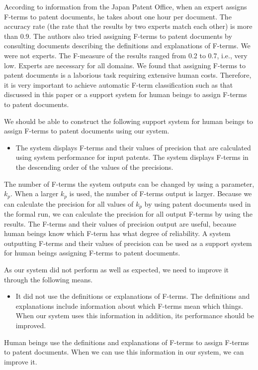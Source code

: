 \documentclass[english]{jnlp_1.2c}
\begin{document}
According to information from the Japan Patent Office, 
when an expert assigns F-terms to patent documents, 
he takes about one hour per document. 
The accuracy rate (the rate that 
the results by two experts match each other) 
is more than 0.9. 
The authors also tried assigning F-terms to patent documents
by consulting documents 
describing 
the definitions and explanations of F-terms. 
We were not experts. 
The F-measure of the results 
ranged from 0.2 to 0.7, i.e., very low. 
Experts are necessary for all domains. 
We found that 
assigning F-terms to patent documents is 
a laborious task 
requiring extensive human costs. 
Therefore, 
it is very important 
to achieve
automatic F-term classification 
such as that discussed in this paper 
or a support system for human beings 
to assign F-terms to patent documents. 

We should be able to construct the following support system 
for human beings to assign F-terms to patent documents 
using our system. 
\begin{itemize}
\item 
  The system displays F-terms and their values of precision
  that are calculated using system performance 
  for input patents. 
  The system displays F-terms 
  in the descending order of 
  the values of the precisions. 
\end{itemize}
The number of F-terms the system outputs 
can be changed by using a parameter, $k_p$. 
When a larger $k_p$ is used, 
the number of F-terms output is larger. 
Because 
we can calculate 
the precision for all values of $k_p$ 
by using patent documents used in the formal run, 
we can calculate the precision for
all output F-terms by using the results. 
The F-terms and their values of precision output
are useful, because 
human beings know
which F-term has what degree of reliability. 
A system outputting F-terms and their values of precision 
can be used as a support system 
for human beings assigning F-terms to patent documents. 

As our system did not perform as well as expected, 
we need to improve it through the following means.
\begin{itemize}
\item 
  It did not use
  the definitions or explanations
  of F-terms. 
  The definitions and explanations 
  include information
  about which F-terms mean which things. 
  When our system uses this information in addition, 
  its performance should be improved.
\end{itemize}
Human beings use
the definitions and explanations of F-terms 
to assign F-terms to patent documents. 
When we can use this information in our system, 
we can improve it.
\end{document}
